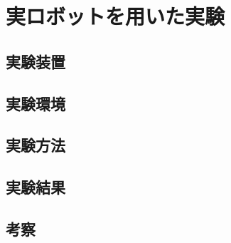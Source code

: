 \chapter{実ロボットを用いた実験}
\label{chap:real_world}


\section{実験装置}
\label{sec:real_setup}


\section{実験環境}
\label{sec:real_env}


\section{実験方法}
\label{sec:real_method}


\section{実験結果}
\label{sec:real_result}


\section{考察}
\label{sec:real_discussion}

